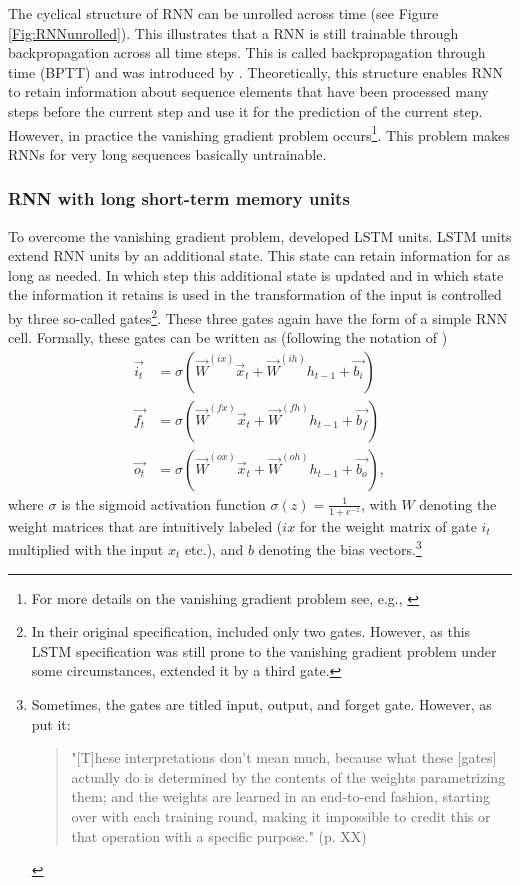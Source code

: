 The cyclical structure of RNN can be unrolled across time (see Figure \ref{Fig:RNNunrolled}). This illustrates that a RNN is still trainable through backpropagation across all time steps. This is called backpropagation through time (BPTT) and was introduced by \citet{Werbos:1990}. Theoretically, this structure enables RNN to retain information about sequence elements that have been processed many steps before the current step and use it for the prediction of the current step. However, in practice the vanishing gradient problem occurs\footnote{For more details on the vanishing gradient problem see, e.g., \citet{Bengio:1994}}. This problem makes RNNs for very long sequences basically untrainable.



\subsubsection{RNN with long short-term memory units}

To overcome the vanishing gradient problem, \citet{Hochreiter:1997} developed LSTM units. LSTM units extend RNN units by an additional state. This state can retain information for as long as needed. In which step this additional state is updated and in which state the information it retains is used in the transformation of the input is controlled by three so-called gates\footnote{In their original specification, \citet{Hochreiter:1997} included only two gates. However, as this LSTM specification was still prone to the vanishing gradient problem under some circumstances, \citet{Gers:2000} extended it by a third gate.}. These three gates again have the form of a simple RNN cell. Formally, these gates can be written as (following the notation of \citet{Lipton:2015})
%
\begin{equation} \label{LSTMgates}
\begin{split}
    \vec{i_t}&=\sigma\left(\vec{W}^{(ix)}\vec{x}_t+\vec{W}^{(ih)}h_{t-1}+\vec{b_i}\right)\\
    \vec{f_t}&=\sigma\left(\vec{W}^{(fx)}\vec{x}_t+\vec{W}^{(fh)}h_{t-1}+\vec{b_f}\right)\\
    \vec{o_t}&=\sigma\left(\vec{W}^{(ox)}\vec{x}_t+\vec{W}^{(oh)}h_{t-1}+\vec{b_o}\right),
\end{split}   
\end{equation}
%
where $\sigma$ is the sigmoid activation function $\sigma(z)=\frac{1}{1+e^{-z}}$, with $W$ denoting the weight matrices that are intuitively labeled ($ix$ for the weight matrix of gate $i_t$ multiplied with the input $x_t$ etc.), and $b$ denoting the bias vectors.\footnote{Sometimes, the gates are titled input, output, and forget gate. However, as \citet{chollet:2018} put it:
\begin{quote}
    "[T]hese interpretations don’t mean much, because what these [gates] actually do is determined by the contents of the weights parametrizing them; and the weights are learned in an end-to-end fashion, starting over with each training round, making it impossible to credit this or that operation with a specific purpose." (p. XX)
\end{quote}
}

